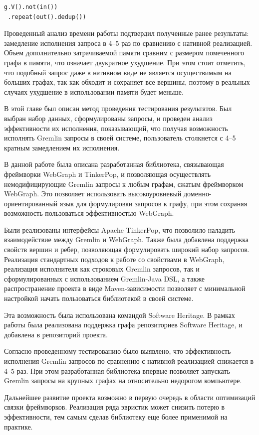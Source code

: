\documentclass[times,specification,annotation]{itmo-student-thesis}
\begin{document}
\begin{lstlisting}[float=!h,caption={Запрос, обходящий весь граф},label={lst:gremlin-dfs}]
g.V().not(in())
 .repeat(out().dedup())
\end{lstlisting}

Проведенный анализ времени работы подтвердил полученные ранее результаты: замедление исполнения запроса в 4--5 раз по сравнению с нативной реализацией. Объем дополнительно затрачиваемой памяти сравним с размером помеченного графа в памяти, что означает двукратное ухудшение. При этом стоит отметить, что подобный запрос даже в нативном виде не является осуществимым на больших графах, так как обходит и сохраняет все вершины, поэтому в реальных случаях ухудшение в использовании памяти будет меньше.
\chapterconclusion

В этой главе был описан метод проведения тестирования результатов. Был выбран набор данных, сформулированы запросы, и проведен анализ эффективности их исполнения, показывающий, что получая возможность исполнять Gremlin запросы в своей системе, пользователь столкнется с 4--5 кратным замедлением их исполнения.

\startconclusionpage

В данной работе была описана разработанная библиотека, связывающая фреймворки WebGraph и TinkerPop, и позволяющая осуществлять немодифицирующие Gremlin запросы к любым графам, сжатым фреймворком WebGraph. Это позволяет использовать высокоуровневый доменно-ориентированный язык для формулировки запросов к графу, при этом сохраняя возможность пользоваться эффективностью WebGraph.

Были реализованы интерфейсы Apache TinkerPop, что позволило наладить взаимодействие между Gremlin и WebGraph. Также была добавлена поддержка свойств вершин и ребер, позволяющая формулировать широкий набор запросов. Реализация стандартных подходов к работе со свойствами в WebGraph, реализация исполнителя как строковых Gremlin запросов, так и сформулированных с использованием Gremlin-Java DSL, а также распространение проекта в виде Maven-зависимости позволяет с минимальной настройкой начать пользоваться библиотекой в своей системе.

Эта возможность была использована командой Software Heritage. В рамках работы была реализована поддержка графа репозиториев Software Heritage, и добавлена в репозиторий проекта.

Согласно проведенному тестированию было выявлено, что эффективность исполнения Gremlin запросов по сравнению с нативной реализацией снижается в 4--5 раз. При этом разработанная библиотека впервые позволяет запускать Gremlin запросы на крупных графах на относительно недорогом компьютере.

Дальнейшее развитие проекта возможно в первую очередь в области оптимизаций связки фреймворков. Реализация ряда эвристик может снизить потерю в эффективности, тем самым сделав библиотеку еще более применимой на практике.

\printmainbibliography
\end{document}
